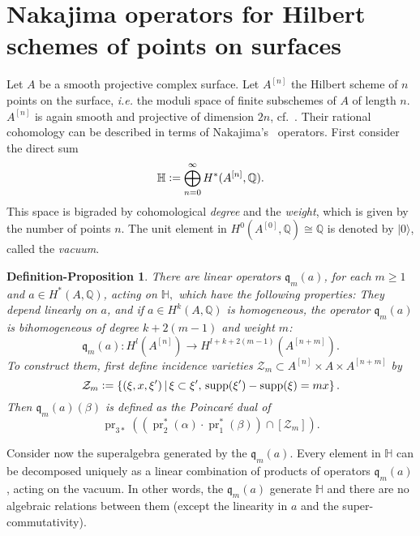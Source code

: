 \documentclass{alggeom}
\DeclareMathOperator{\Hilb}{Hilb}
\DeclareMathOperator{\pr}{pr}
\DeclareMathOperator{\supp}{supp}
\newcommand{\hilb}[1]{^{[#1]}}
\newcommand{\ie}{{\it i.e. }}
\newcommand{\vac}{|0\rangle}
\newcommand{\q}{\mathfrak{q}}
\newcommand{\defIs}{\vcentcolon=}
\renewcommand{\H}{\mathbb{H}}
\newcommand{\Q}{\mathbb{Q}}
\theoremstyle{plain}
\newtheorem{defipro}[theorem]{Definition-Proposition}
\theoremstyle{definition}
\theoremstyle{remark}
\begin{document}
\section[Nakajima operators for Hilbert schemes of points on surfaces]{Nakajima operators for Hilbert schemes of points on surfaces%
}
\label{Section_Hilbert}
Let $A$ be a smooth projective complex surface. 
Let $A\hilb{n}$ the Hilbert scheme of $n$ points on the surface, \ie the moduli space of finite subschemes of $A$ of length $n$.
$A\hilb{n}$ is again smooth and projective of dimension $2n$, cf.~\cite{Fogarty}. 
Their rational cohomology can be described in terms of Nakajima's~\cite{Nakajima} operators. First consider the direct sum
$$
\H \defIs  \bigoplus_{n=0}^{\infty} H^*(A\hilb{n},\Q).
$$
This space is bigraded by cohomological \emph{degree} and the \emph{weight}, which is given by the number of points $n$. The unit element in $H^0(A\hilb{0},\Q) \cong \Q$ is denoted by $\vac$, called the \emph{vacuum}.
\begin{defipro}
There are linear operators $\q_m(a)$, for each $m\geq 1$ and $a \in H^*(A,\Q)$, acting on $\H,$ which have the following properties: They depend linearly on $a$, and if $a\in H^k(A,\Q)$ is homogeneous, the operator $\q_{m}(a)$ is bihomogeneous of degree $k+2(m-1)$ and weight $m$:
$$
\q_{m}(a) : H^l(A\hilb{n}) \rightarrow H^{l+k+2(m-1)}(A\hilb{n+m}).
$$
To construct them, first define incidence varieties $\mathcal Z_m\subset A\hilb{n}\times A\times A\hilb{n+m}$ by
$$
\mathcal Z_m \defIs  \left\{(\xi,x,\xi')\, |\, \xi\subset\xi',\, \supp(\xi') -\supp(\xi) = mx \right\}.
$$
Then $\q_m(a)(\beta) $ is defined as the Poincar\'e dual of 
$$
\pr_{3*}\left( \left(\pr_2^*(\alpha)\cdot \pr_1^*(\beta)\right) \cap [\mathcal Z_m] \right).
$$
\end{defipro}
Consider now the superalgebra generated by the $\q_m(a)$. 
Every element in $\H$ can be decomposed uniquely as a linear combination of products of operators $\q_{m}(a)$, acting on the vacuum. 
In other words, the $\q_m(a)$ generate $\H$ and there are no algebraic relations between them (except the linearity in $a$ and the super-commutativity).
\end{document}
